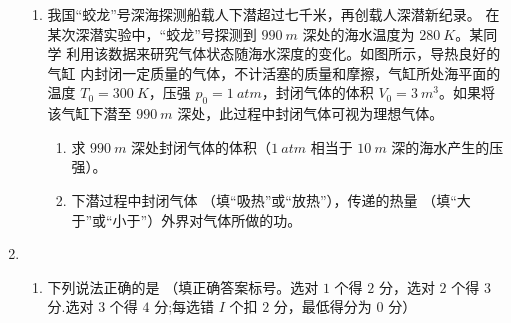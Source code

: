 \begin{enumerate}
\begin{enumerate}
\item 
我国“蛟龙”号深海探测船载人下潜超过七千米，再创载人深潜新纪录。
在某次深潜实验中，“蛟龙”号探测到 $ 990 \ m $ 深处的海水温度为 $ 280 \ K $。某同学
利用该数据来研究气体状态随海水深度的变化。如图所示，导热良好的气缸
内封闭一定质量的气体，不计活塞的质量和摩擦，气缸所处海平面的温度 $ T_{0}  =300 \ K $，压强 $ p_{0} =1 \ atm $，封闭气体的体积 $ V_{0}=3 \ m^{3} $。如果将该气缸下潜至
$ 990 \ m $ 深处，此过程中封闭气体可视为理想气体。
\begin{enumerate}
	\item
求 $ 990 \ m $ 深处封闭气体的体积（$ 1 \ atm $ 相当于 $ 10 \ m $ 深的海水产生的压强）。
\item 
下潜过程中封闭气体 \underlinegap （填“吸热”或“放热”），传递的热量 \underlinegap （填“大于”或“小于”）外界对气体所做的功。

\end{enumerate}
\begin{figure}[h!]
	\flushright
	
\end{figure}


	
\end{enumerate}





\item
{}
\begin{enumerate}
	\item
下列说法正确的是
 \underlinegap 
（填正确答案标号。选对 $ 1 $ 个得 $ 2 $ 分，选对 $ 2 $ 个得 $ 3 $ 分.选对 $ 3 $
个得 $ 4 $ 分;每选错 $ I $ 个扣 $ 2 $ 分，最低得分为 $ 0 $ 分）




\end{enumerate}
\end{enumerate}
